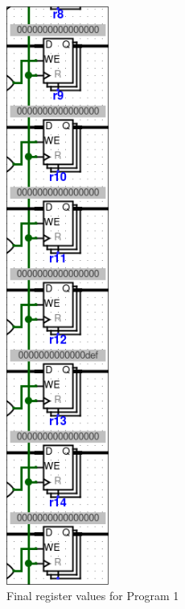 \documentclass{article}
\begin{document}
\begin{minipage}{0.5\textwidth}
    \begin{figure}[H]
        \centering
        \includegraphics[width=0.3\textwidth]{./images/test1_reg2.png}
        \caption{Final register values for Program 1}
    \end{figure}
\end{minipage}
\end{document}
